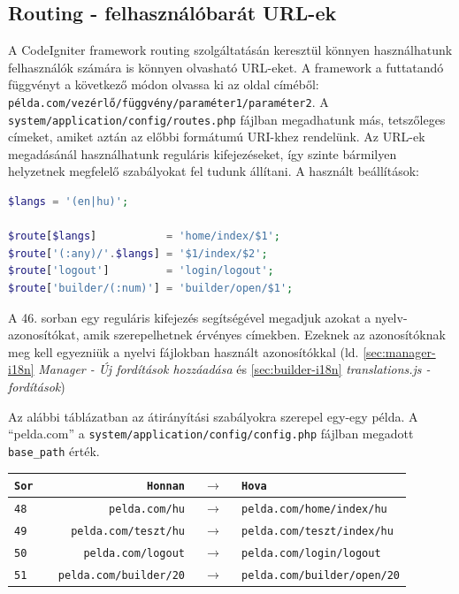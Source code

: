 \documentclass[12pt,a4paper,twoside]{article}
\begin{document}
\subsection{Routing - felhasználóbarát URL-ek}

A CodeIgniter framework routing\cite{CI-Routing} szolgáltatásán keresztül
könnyen használhatunk felhasználók számára is könnyen olvasható URL-eket.
A framework a futtatandó függvényt a következő módon olvassa ki az oldal
címéből: \texttt{példa.com/vezérlő/függvény/paraméter1/paraméter2}.
A \texttt{system/application/config/routes.php} fájlban megadhatunk más,
tetszőleges címeket, amiket aztán az előbbi formátumú URI-khez rendelünk. Az
URL-ek megadásánál használhatunk reguláris kifejezéseket\cite{regex}, így szinte
bármilyen helyzetnek megfelelő szabályokat fel tudunk állítani. A használt
beállítások:

\begin{lstlisting}[language=PHP, firstnumber=46]
$langs = '(en|hu)';

$route[$langs]           = 'home/index/$1';
$route['(:any)/'.$langs] = '$1/index/$2';
$route['logout']         = 'login/logout';
$route['builder/(:num)'] = 'builder/open/$1';
\end{lstlisting}

A 46. sorban egy reguláris kifejezés segítségével megadjuk azokat a
nyelv-azonosítókat, amik szerepelhetnek érvényes címekben. Ezeknek az
azonosítóknak meg kell egyezniük a nyelvi fájlokban használt azonosítókkal
(ld. \ref{sec:manager-i18n} \textit{Manager - Új fordítások hozzáadása} és
\ref{sec:builder-i18n} \textit{translations.js - fordítások})

Az alábbi táblázatban az átirányítási szabályokra szerepel egy-egy példa. A
``pelda.com'' a \texttt{system/application/config/config.php} fájlban megadott
\texttt{base\_path} érték.

\vspace{.4cm}
\begin{tabular*}{\textwidth}{>{\tt}l|>{\tt}r>{$\rightarrow$}c>{\tt}l}
  \rm Sor & \rm Honnan           & & \rm Hova        \\
  \hline
  48      & pelda.com/hu         & & pelda.com/home/index/hu  \\
  49      & pelda.com/teszt/hu   & & pelda.com/teszt/index/hu \\
  50      & pelda.com/logout     & & pelda.com/login/logout   \\
  51      & pelda.com/builder/20 & & pelda.com/builder/open/20
\end{tabular*}
\end{document}
